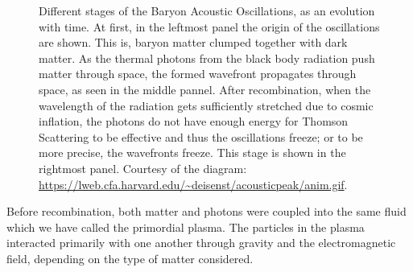 \begin{figure}[t]
	\centering
	\caption[Different stages of the Baryon Acoustic Oscillations.]{Different stages of the Baryon Acoustic Oscillations, as an evolution with time. At first, in the leftmost panel the origin of the oscillations are shown. This is, baryon matter clumped together with dark matter. As the thermal photons from the black body radiation push matter through space, the formed wavefront propagates through space, as seen in the middle pannel. After recombination, when the wavelength of the radiation gets sufficiently stretched due to cosmic inflation, the photons do not have enough energy for Thomson Scattering to be effective and thus the oscillations freeze; or to be more precise, the wavefronts freeze. This stage is shown in the rightmost panel.   Courtesy of the diagram: \url{https://lweb.cfa.harvard.edu/~deisenst/acousticpeak/anim.gif}.}
	\label{fig:scheme-BAO}
\end{figure}

Before recombination, both matter and photons were coupled into the same fluid which we have called the primordial plasma. The particles in the plasma interacted primarily with one another through gravity and the electromagnetic field, depending on the type of matter considered.  \\

